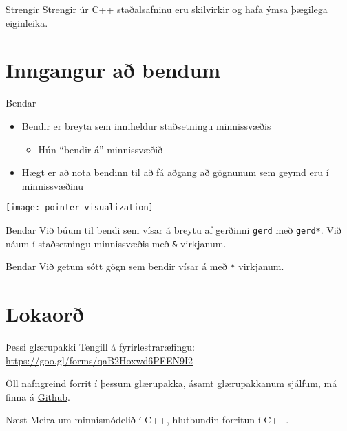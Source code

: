 \documentclass[handout]{beamer}
\begin{document}
\begin{frame}{Strengir}
Strengir úr C++ staðalsafninu eru skilvirkir og hafa ýmsa þægilega eiginleika.

\end{frame}


\section{Inngangur að bendum}

\begin{frame}{Bendar}
\begin{itemize}
 \item Bendir er breyta sem inniheldur staðsetningu minnissvæðis
 \begin{itemize}
  \item Hún ``bendir á'' minnissvæðið
 \end{itemize}
 \item Hægt er að nota bendinn til að fá aðgang að gögnunum sem geymd eru í minnissvæðinu
\end{itemize}
\begin{center}
\texttt{[image: pointer-visualization]}
\end{center}
\end{frame}

\begin{frame}[fragile]{Bendar}
Við búum til bendi sem vísar á breytu af gerðinni \texttt{gerd} með \texttt{gerd*}. Við náum í staðsetningu minnissvæðis með \texttt{\&} virkjanum.
\end{frame}

\begin{frame}[fragile]{Bendar}
Við getum sótt gögn sem bendir vísar á með \texttt{*} virkjanum.
\end{frame}


\section{Lokaorð}

\begin{frame}{Þessi glærupakki}
Tengill á fyrirlestraræfingu: \url{https://goo.gl/forms/qaB2Hoxwd6PFEN9I2}
\vspace{1cm}

Öll nafngreind forrit í þessum glærupakka, ásamt glærupakkanum sjálfum, má finna á  \href{https://github.com/Ernir/kennsluefni/tree/master/T2/Code/w1}{Github}.

\end{frame}


\begin{frame}{Næst}
Meira um minnismódelið í C++, hlutbundin forritun í C++.
\end{frame}
\end{document}
